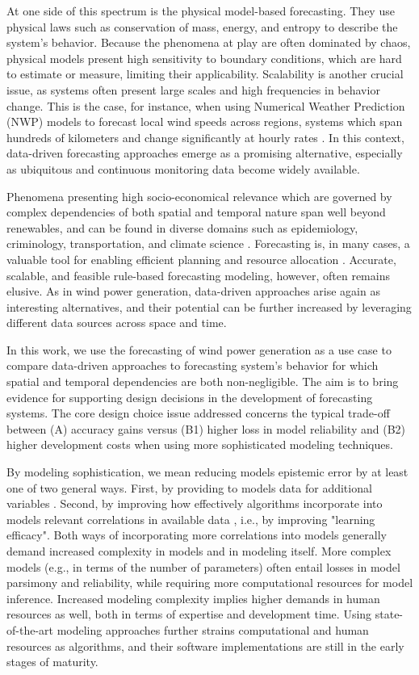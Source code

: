 At one side of this spectrum is the physical model-based forecasting.
They use physical laws such as conservation of mass, energy, and entropy to describe the system's behavior.
Because the phenomena at play are often dominated by chaos, physical models present high sensitivity to boundary conditions, which are hard to estimate or measure, limiting their applicability.
Scalability is another crucial issue, as systems often present large scales and high frequencies in behavior change.
This is the case, for instance, when using Numerical Weather Prediction (NWP) models to forecast local wind speeds across regions, systems which span hundreds of kilometers and change significantly at hourly rates \cite{holttinen2005hourly}.
In this context, data-driven forecasting approaches emerge as a promising alternative, especially as ubiquitous and continuous monitoring data become widely available.

Phenomena presenting high socio-economical relevance which are governed by complex dependencies of both spatial and temporal nature span well beyond renewables, and can be found in diverse domains such as epidemiology, criminology, transportation, and climate science \cite{atluri2018datamining}.
Forecasting is, in many cases, a valuable tool for enabling efficient planning and resource allocation \cite{armstrong2002principles}.
Accurate, scalable, and feasible rule-based forecasting modeling, however, often remains elusive.
As in wind power generation, data-driven approaches arise again as interesting alternatives, and their potential can be further increased by leveraging different data sources across space and time.

In this work, we use the forecasting of wind power generation as a use case to compare data-driven approaches to forecasting system's behavior for which spatial and temporal dependencies are both non-negligible.
The aim is to bring evidence for supporting design decisions in the development of forecasting systems.
The core design choice issue addressed concerns the typical trade-off between (A) accuracy gains versus (B1) higher loss in model reliability and (B2) higher development costs when using more sophisticated modeling techniques.

By modeling sophistication, we mean reducing models epistemic error by at least one of two general ways.
First, by providing to models data for additional variables \cite{hullermeier2020aleatoric}.
Second, by improving how effectively algorithms incorporate into models relevant correlations in available data \cite{hullermeier2020aleatoric}, i.e., by improving "learning efficacy".
Both ways of incorporating more correlations into models generally demand increased complexity in models and in modeling itself.
More complex models (e.g., in terms of the number of parameters) often entail losses in model parsimony and reliability, while requiring more computational resources for model inference.
Increased modeling complexity implies higher demands in human resources as well, both in terms of expertise and development time.
Using state-of-the-art modeling approaches further strains computational and human resources as algorithms, and their software implementations are still in the early stages of maturity.


